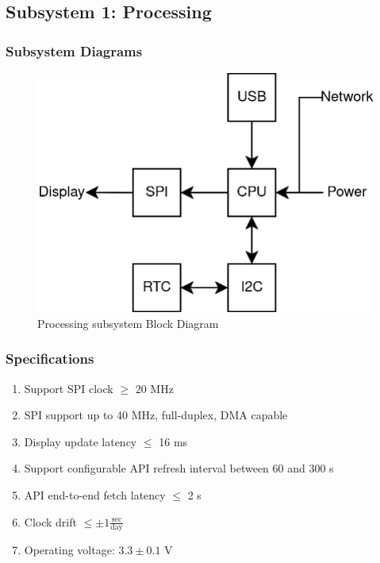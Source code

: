 \subsection{Subsystem 1: Processing}

\subsubsection{Subsystem Diagrams}
\begin{figure}[h]
    \centering
    \includegraphics[width=12cm]{images/Processing_Subsystem_Block_Diagram.png} %
    \caption{Processing subsystem Block Diagram}
\end{figure} %

\subsubsection{Specifications}
\begin{enumerate}
    \item Support SPI clock $\geq$ 20 MHz
    \item SPI support up to 40 MHz, full-duplex, DMA capable
    \item Display update latency $\leq$ 16 ms
    \item Support configurable API refresh interval between 60 and 300 s
    \item API end-to-end fetch latency $\leq$ 2 s
    \item Clock drift $\leq \pm 1\frac{\text{sec}}{\text{day}}$
    \item Operating voltage: $3.3 \pm 0.1$ V
\end{enumerate}


